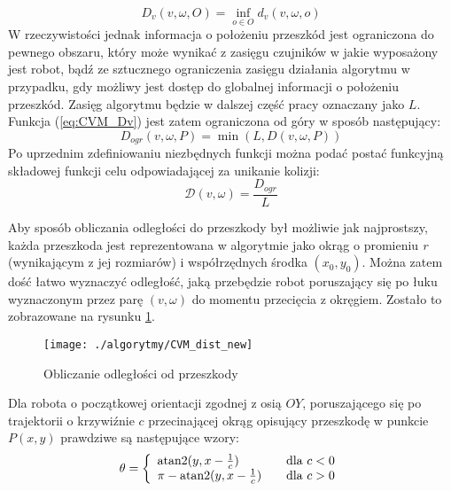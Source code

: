  	\begin{equation}\label{eq:CVM_Dv2}
	D_v(v,\omega,O)= \underset{o \in O}{\operatorname{inf}} d_v(v,\omega,o)
	\end{equation}
	W rzeczywistości jednak informacja o położeniu przeszkód jest ograniczona do pewnego obszaru, który może
	wynikać z zasięgu czujników w jakie wyposażony jest robot, bądź ze sztucznego ograniczenia zasięgu działania
	algorytmu w przypadku, gdy możliwy jest dostęp do globalnej informacji o położeniu przeszkód. Zasięg algorytmu  będzie  w dalszej część pracy oznaczany jako $L$. Funkcja  (\ref{eq:CVM_Dv})
	jest zatem ograniczona od góry w sposób następujący:
 	\begin{equation}\label{eq:CVM_Dv_ogr}
	D_{ogr}(v,\omega,P)= \min(L, D(v,\omega,P))
	\end{equation}
	Po uprzednim zdefiniowaniu niezbędnych funkcji  można podać postać funkcyjną składowej funkcji celu odpowiadającej za unikanie kolizji:
	\begin{equation} \label{eq:CVM_dist}
	\mathcal{D}(v,\omega)=\frac{D_{ogr}}{L}
	\end{equation}
 	
	Aby sposób obliczania odległości do przeszkody był możliwie jak najprostszy, każda przeszkoda jest
	reprezentowana w algorytmie jako okrąg o  promieniu \emph{r} (wynikającym z jej rozmiarów) i współrzędnych środka $(x_0,y_0)$. Można zatem dość łatwo wyznaczyć odległość, jaką przebędzie robot poruszający się po łuku wyznaczonym przez parę $(v,\omega)$ do
	momentu przecięcia z okręgiem. Zostało to zobrazowane na rysunku \ref{fig:CVM_dist}.
	\begin{figure}[!b]
	\centering
	\texttt{[image: ./algorytmy/CVM\_dist\_new]}
	\caption{ Obliczanie odległości od przeszkody \label{fig:CVM_dist}}
	\end{figure}
	
	Dla robota o początkowej orientacji zgodnej z osią $OY$, poruszającego się po trajektorii o krzywiźnie $c$ przecinającej
	okrąg opisujący przeszkodę w punkcie $P(x,y)$ prawdziwe są następujące wzory:
	\begin{equation}\label{eq:CVM_teta}
	\theta= \left\{ 
	\begin{array}{l l}
	\text{atan2}(y,x-\frac{1}{c} )& \quad \mbox{dla $c<0$}\\
  	\pi-\text{atan2}(y,x-\frac{1}{c}) & \quad \mbox{dla $c>0$}\\
	\end{array} \right. 
	\end{equation}
	

